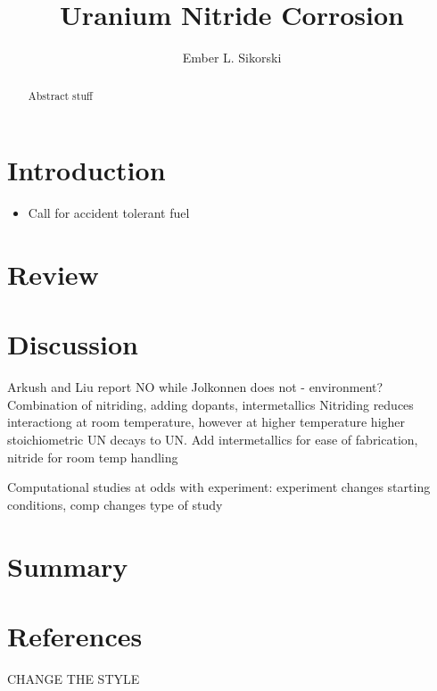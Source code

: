 \documentclass[3p,review,11pt]{elsarticle}
\begin{document}
\begin{frontmatter}
	\title{Uranium Nitride Corrosion}
	
	\author[boise]{Ember L. Sikorski}
	
	
	\address[boise]{Boise State University}
	
	\begin{abstract}
Abstract stuff
	\end{abstract}	
	
\end{frontmatter}


\section{Introduction}

\begin{itemize}
	\item Call for accident tolerant fuel
\end{itemize}

\section{Review}



\section{Discussion}
Arkush and Liu report NO while Jolkonnen does not - environment?
Combination of nitriding, adding dopants, intermetallics
Nitriding reduces interactiong at room temperature, however at higher temperature higher stoichiometric UN decays to UN.
Add intermetallics for ease of fabrication, nitride for room temp handling
\par 
Computational studies at odds with experiment: experiment changes starting conditions, comp changes type of study


\section{Summary}






\cite{Jolkkonen2017}





\section*{References}
CHANGE THE STYLE



\end{document}
